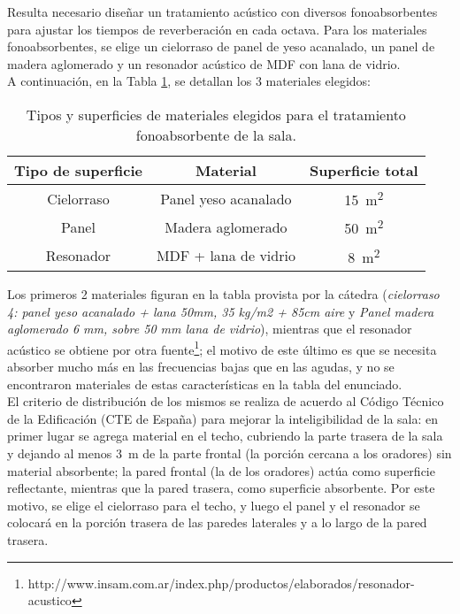 			Resulta necesario diseñar un tratamiento acústico con diversos fonoabsorbentes para ajustar los tiempos de reverberación en cada octava. Para los materiales fonoabsorbentes, se elige un cielorraso de panel de yeso acanalado, un panel de madera aglomerado y un resonador acústico de MDF con lana de vidrio.\\
			
			A continuación, en la Tabla \ref{tabla:fonos}, se detallan los 3 materiales elegidos:
		
		\begin{table}[H]
			\centering
			\begin{tabular}{ccc}
			\toprule
			\textbf{Tipo de superficie} & \textbf{Material} & \textbf{Superficie total}\\
			\midrule
			Cielorraso & Panel yeso acanalado & \SI{15}{\square\m}\\
			\midrule
			Panel & Madera aglomerado & \SI{50}{\square\m}\\
			\midrule
			Resonador & MDF + lana de vidrio & \SI{8}{\square\m}\\
			\bottomrule
			\end{tabular}
			\caption{Tipos y superficies de materiales elegidos para el tratamiento fonoabsorbente de la sala.}
			\label{tabla:fonos}
		\end{table}
		
		Los primeros 2 materiales figuran en la tabla provista por la cátedra (\emph{cielorraso 4: panel yeso acanalado + lana 50mm, 35 kg/m2 + 85cm aire} y \emph{Panel madera aglomerado 6 mm, sobre 50 mm lana de vidrio}), mientras que el resonador acústico se obtiene por otra fuente\footnote{http://www.insam.com.ar/index.php/productos/elaborados/resonador-acustico}; el motivo de este último es que se necesita absorber mucho más en las frecuencias bajas que en las agudas, y no se encontraron materiales de estas características en la tabla del enunciado.\\
		
		El criterio de distribución de los mismos se realiza de acuerdo al Código Técnico de la Edificación (CTE de España) para mejorar la inteligibilidad de la sala: en primer lugar se agrega material en el techo, cubriendo la parte trasera de la sala y dejando al menos \SI{3}{\m} de la parte frontal (la porción cercana a los oradores) sin material absorbente; la pared frontal (la de los oradores) actúa como superficie reflectante, mientras que la pared trasera, como superficie absorbente. Por este motivo, se elige el cielorraso para el techo, y luego el panel y el resonador se colocará en la porción trasera de las paredes laterales y a lo largo de la pared trasera.\\
		
